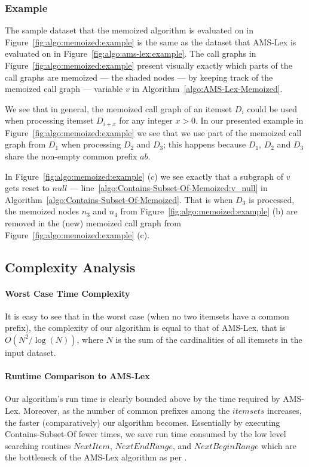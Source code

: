 \documentclass[13pt,a4paper]{article}
\begin{document}
\subsubsection{Example}
\label{sec:memoized:algo:example}

The sample dataset that the memoized algorithm is evaluated on in Figure~\ref{fig:algo:memoized:example} is the same as the dataset that AMS-Lex is evaluated on in Figure~\ref{fig:algo:ams-lex:example}. The call graphs in Figure~\ref{fig:algo:memoized:example} present visually exactly which parts of the call graphs are memoized --- the shaded nodes --- by keeping track of the memoized call graph --- variable $v$ in Algorithm~\ref{algo:AMS-Lex-Memoized}. 

We see that in general, the memoized call graph of an itemset $D_i$ could be used when processing itemset $D_{i+x}$ for any integer $x > 0$. In our presented example in Figure~\ref{fig:algo:memoized:example} we see that we use part of the memoized call graph from $D_1$ when processing $D_2$ and $D_3$; this happens because $D_1$, $D_2$ and $D_3$ share the non-empty common prefix $ab$.

In Figure~\ref{fig:algo:memoized:example} (c) we see exactly that a subgraph of $v$ gets reset to $null$ --- line~\ref{algo:Contains-Subset-Of-Memoized:v_null} in Algorithm~\ref{algo:Contains-Subset-Of-Memoized}. That is when $D_3$ is processed, the memoized nodes $n_3$ and $n_4$ from Figure~\ref{fig:algo:memoized:example} (b) are removed in the (new) memoized call graph from Figure~\ref{fig:algo:memoized:example} (c).



\subsection{Complexity Analysis}

\paragraph{Worst Case Time Complexity}
It is easy to see that in the worst case (when no two itemsets have a common prefix), the complexity of our algorithm is equal to that of AMS-Lex, that is  $O(N^{2} / \log(N))$, where $N$ is the sum of the cardinalities of all itemsets in the input dataset.

\paragraph{Runtime Comparison to AMS-Lex}
Our algorithm's run time is clearly bounded above by the time required by AMS-Lex. Moreover, as the number of common prefixes among the $itemsets$ increases, the faster (comparatively) our algorithm becomes. Essentially by executing Contains-Subset-Of fewer times, we save run time consumed by the low level searching routines $NextItem$, $NextEndRange$, and $NextBeginRange$ which are the bottleneck of the AMS-Lex algorithm as per \cite{BayardoPanda11}.
\end{document}
